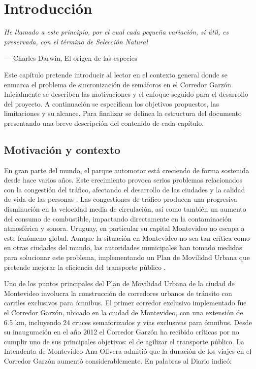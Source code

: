\chapter{Introducción}
\epigraph{ \textit{He llamado a este principio, por el cual cada pequeña variación, si útil, es preservada, con el término de Selección Natural}}{--- Charles Darwin, El origen de las especies}

Este capítulo pretende introducir al lector en el contexto general donde se enmarca el problema de sincronización de semáforos en el Corredor Garzón. Inicialmente se describen las motivaciones y el enfoque seguido para el desarrollo del proyecto. A continuación se especifican los objetivos propuestos, las limitaciones y su alcance. Para finalizar se delinea la estructura del documento presentando una breve descripción del contenido de cada capítulo. 

\section{Motivación y contexto}

En gran parte del mundo, el parque automotor está creciendo de forma sostenida desde hace varios años. Este crecimiento provoca serios problemas relacionados con la congestión del tráfico, afectando el desarrollo de las ciudades y la calidad de vida de las personas \citep{Cepal2003}. Las congestiones de tráfico producen una progresiva disminución en la velocidad media de circulación, así como también un aumento del consumo de combustible, impactando directamente en la contaminación atmosférica y sonora. Uruguay, en particular su capital Montevideo no escapa a este fenómeno global. Aunque la situación en Montevideo no sea tan crítica como en otras ciudades del mundo, las autoridades municipales han tomado medidas para solucionar este problema, implementando un Plan de Movilidad Urbana que pretende mejorar la eficiencia del transporte público \citep{PlanMovilidad}.

Uno de los puntos principales del Plan de Movilidad Urbana de la ciudad de Montevideo involucra la construcción de corredores urbanos de tránsito con carriles exclusivos para ómnibus. El primer corredor exclusivo implementado fue el Corredor Garzón, ubicado en la ciudad de Montevideo, con una extensión de 6.5 km, incluyendo 24 cruces semaforizados y vías exclusivas para ómnibus. Desde su inauguración en el año 2012 el Corredor Garzón ha recibido críticas por no cumplir uno de sus principales objetivos: el de agilizar el transporte público. La Intendenta de Montevideo Ana Olivera admitió que la duración de los viajes en el Corredor Garzón aumentó considerablemente. En palabras al Diario \cite{olivera2015} indicó: 


